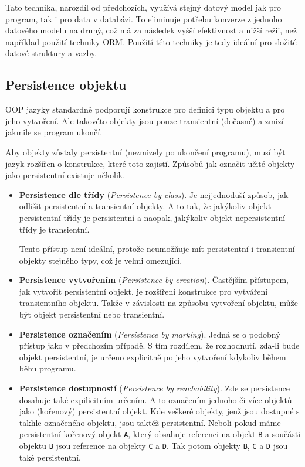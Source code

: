 Tato technika, narozdíl od předchozích, využívá stejný datový model jak pro program, tak i pro data v databázi. To eliminuje potřebu konverze z jednoho datového modelu na druhý, což má za následek vyšší efektivnost a nižší režii, než například použití techniky ORM. Použití této techniky je tedy ideální pro složité datové struktury a vazby.

\subsection{Persistence objektu}
OOP jazyky standardně podporují konstrukce pro definici typu objektu a pro jeho vytvoření. Ale takovéto objekty jsou pouze transientní (dočasné) a zmizí jakmile se program ukončí.

Aby objekty zůstaly persistentní (nezmizely po ukončení programu), musí být jazyk rozšířen o konstrukce, které toto zajistí. Způsobů jak označit učité objekty jako persistentní existuje několik.
\begin{itemize}
  \item \textbf{Persistence dle třídy} (\emph{Persistence by class}). Je nejjednoduší způsob, jak odlišit persistentní a transientní objekty. A to tak, že jakýkoliv objekt persistentní třídy je persistentní a naopak, jakýkoliv objekt nepersistentní třídy je transientní.
  
  Tento přístup není ideální, protože neumožňuje mít persistentní i transientní objekty stejného typy, což je velmi omezující.
  \item \textbf{Persistence vytvořením} (\emph{Persistence by creation}). Častějším přístupem, jak vytvořit persistentní objekt, je rozšíření konstrukce pro vytváření transientního objektu. Takže v závislosti na způsobu vytvoření objektu, může být objekt persistentní nebo transientní.
  \item \textbf{Persistence označením} (\emph{Persistence by marking}). Jedná se o podobný přístup jako v předchozím případě. S tím rozdílem, že rozhodnutí, zda-li bude objekt persistentní, je určeno explicitně po jeho vytvoření kdykoliv během běhu programu.
  \item \textbf{Persistence dostupností} (\emph{Persistence by reachability}). Zde se persistence dosahuje také expilicitním určením. A to označením jednoho či více objektů jako (kořenový) persistentní objekt. Kde veškeré objekty, jenž jsou dostupné s takhle označeného objektu, jsou taktéž persistentní. Neboli pokud máme persistentní kořenový objekt \texttt{A}, který obsahuje referenci na objekt \texttt{B} a součásti objektu \texttt{B} jsou reference na objekty \texttt{C} a \texttt{D}. Tak potom objekty \texttt{B}, \texttt{C} a \texttt{D} jsou také persistentní.
\end{itemize}

